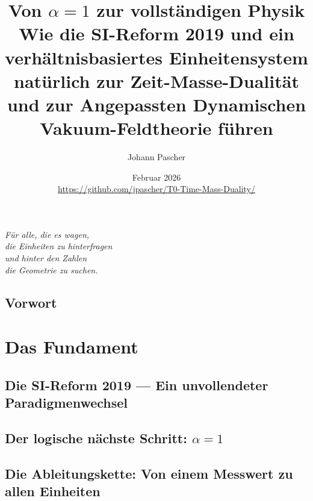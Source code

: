 \documentclass[11pt,twoside,openright]{book}
\title{%
  {\LARGE Von $\alpha = 1$ zur vollständigen Physik}\\[10pt]
  {\normalsize Wie die SI-Reform 2019 und ein verhältnisbasiertes Einheitensystem
  natürlich zur Zeit-Masse-Dualität und zur
  Angepassten Dynamischen Vakuum-Feldtheorie führen}
}
\author{Johann Pascher}
\date{Februar 2026\\[6pt]
  \footnotesize\url{https://github.com/jpascher/T0-Time-Mass-Duality/}}
\begin{document}
\frontmatter


\thispagestyle{empty}
\restoregeometry
\cleardoublepage

\maketitle

\cleardoublepage
\thispagestyle{empty}
\vspace*{0.3\textheight}
\begin{center}
\itshape\large
Für alle, die es wagen,\\
die Einheiten zu hinterfragen\\
und hinter den Zahlen\\
die Geometrie zu suchen.
\end{center}
\vfill

\tableofcontents

\chapter{Vorwort}


\mainmatter

\part{Das Fundament}

\chapter{Die SI-Reform 2019 --- Ein unvollendeter Paradigmenwechsel}


\chapter{Der logische nächste Schritt: $\alpha = 1$}


\chapter{Die Ableitungskette: Von einem Messwert zu allen Einheiten}

\end{document}
